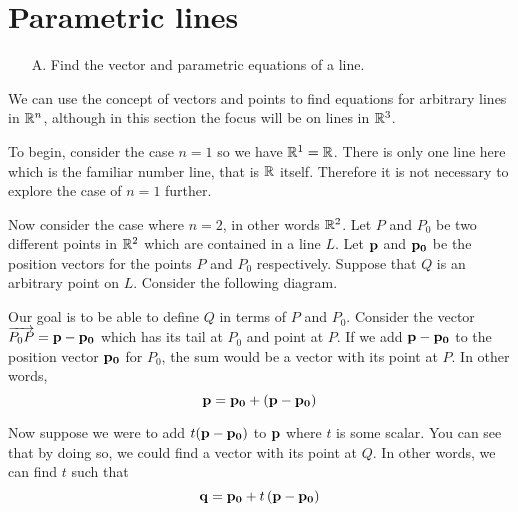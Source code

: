 \section{Parametric lines}

\begin{outcome}

\begin{enumerate}

\item[A.] Find the vector and parametric equations of a line.

\end{enumerate}
\end{outcome}

We can use the concept of vectors and points to find equations for arbitrary lines in $\mathbb{R}^n$, although in this section the focus will be on lines in $\mathbb{R}^3$. 

To begin, consider the case $n=1$ so we have $\mathbb{R}^{1}=\mathbb{R}$. There is only one line here which is the familiar number line, that is $\mathbb{R}$ itself. Therefore it is not necessary to explore the case of $n=1$ further. 

Now consider the case where $n=2$, in other words $\mathbb{R}^2$.  Let $P $ and $P_0$ be
two different points in $\mathbb{R}^{2}$ which are contained in a line
$L$. Let ${\bf p}$ and ${\bf p_0}$ be the position vectors for the points $P$ and $P_0$
respectively. Suppose that $Q$ is an arbitrary point on $L$. Consider the following
diagram.

\begin{center}
\end{center}

Our goal is to be able to define $Q$ in terms of $P$  and $P_0$. Consider the vector $\overrightarrow{P_0P} = {\bf p} - {\bf p_0}$ which
has its tail at $P_0$ and point at $P$. If we add ${\bf p} - {\bf p_0}$ to the position vector ${\bf p_0}$ for $P_0$,  
the sum would be a vector with its point at $P$. 
In other words,
\begin{equation*}
{\bf p} = {\bf p_0} + ({\bf p} - {\bf p_0})
\end{equation*}

Now suppose we were to add $t({\bf p} - {\bf p_0})$ to ${\bf p}$ where $t$ is some scalar.
You can see that by doing so, we could find a vector with its point at $Q$. In other words, we can find $t$ such that 
\begin{equation*}
{\bf q} = {\bf p_0} + t \left({\bf p}- {\bf p_0}\right)
\end{equation*}

